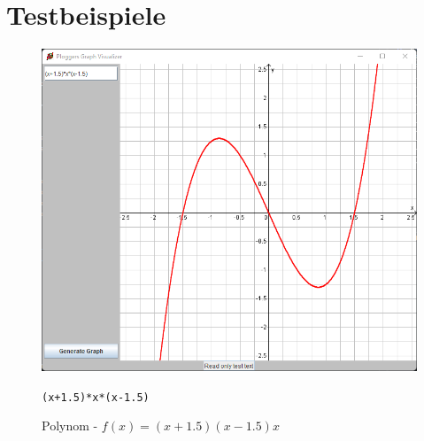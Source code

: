 \documentclass[12pt]{article}
\begin{document}
	\section*{Testbeispiele}

	\begin{figure}[!ht]
		\begin{center}
		\includegraphics[scale=0.75]{images/sample1.png}
		\end{center}
		\caption{Polynom - $f(x) = (x+1.5)(x-1.5)x$}
		
		\begin{center}
			\texttt{(x+1.5)*x*(x-1.5)}
		\end{center}
	\end{figure}
\end{document}
